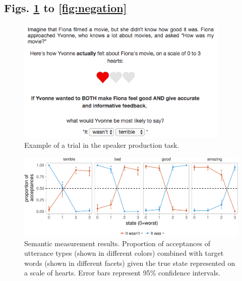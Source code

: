 \documentclass[12pt]{article}
\newcommand{\beginsupplement}{%
        \setcounter{table}{0}
        \renewcommand{\thetable}{S\arabic{table}}%
        \setcounter{figure}{0}
        \renewcommand{\thefigure}{S\arabic{figure}}%
     }
\begin{document}
\newpage

\subsection*{Figs. \ref{fig:screenshot} to \ref{fig:negation}}\label{supplemental-figures}

\setcounter{figure}{0}
\beginsupplement

\begin{figure}[!h]
\centering
\includegraphics[width=3.98in]{fig/screenshot} \caption{Example of a trial in the speaker production task.}\label{fig:screenshot}
\end{figure}

\begin{figure}[!h]
\includegraphics[width=\textwidth]{polite_manuscript_files/figure-latex/litsem-1} \caption{Semantic measurement results. Proportion of acceptances of utterance types (shown in different colors) combined with target words (shown in different facets) given the true state represented on a scale of hearts. Error bars represent 95\% confidence intervals.}\label{fig:litsem}
\end{figure}
\end{document}
